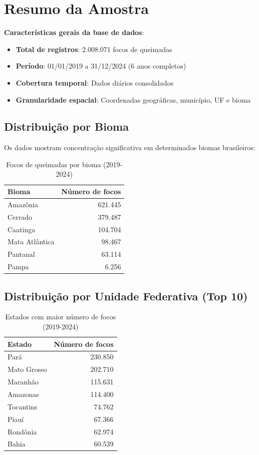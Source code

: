 \documentclass[12pt,a4paper]{report}
\begin{document}
\section{Resumo da Amostra}

\noindent\textbf{Características gerais da base de dados}:

\begin{itemize}
  \item \textbf{Total de registros}: 2.008.071 focos de queimadas
  \item \textbf{Período}: 01/01/2019 a 31/12/2024 (6 anos completos)
  \item \textbf{Cobertura temporal}: Dados diários consolidados
  \item \textbf{Granularidade espacial}: Coordenadas geográficas, município, UF e bioma
\end{itemize}

\subsection{Distribuição por Bioma}

Os dados mostram concentração significativa em determinados biomas brasileiros:

\begin{table}[h]
\centering
\caption{Focos de queimadas por bioma (2019-2024)}
\label{tab:biomas}
\begin{tabular}{lr}
\toprule
\textbf{Bioma} & \textbf{Número de focos} \\
\midrule
Amazônia & 621.445 \\
Cerrado & 379.487 \\
Caatinga & 104.704 \\
Mata Atlântica & 98.467 \\
Pantanal & 63.114 \\
Pampa & 6.256 \\
\bottomrule
\end{tabular}
\end{table}

\subsection{Distribuição por Unidade Federativa (Top 10)}

\begin{table}[h]
\centering
\caption{Estados com maior número de focos (2019-2024)}
\label{tab:top10_ufs}
\begin{tabular}{lr}
\toprule
\textbf{Estado} & \textbf{Número de focos} \\
\midrule
Pará & 230.850 \\
Mato Grosso & 202.710 \\
Maranhão & 115.631 \\
Amazonas & 114.400 \\
Tocantins & 74.762 \\
Piauí & 67.366 \\
Rondônia & 62.974 \\
Bahia & 60.539 \\
\bottomrule
\end{tabular}
\end{table}
\end{document}
